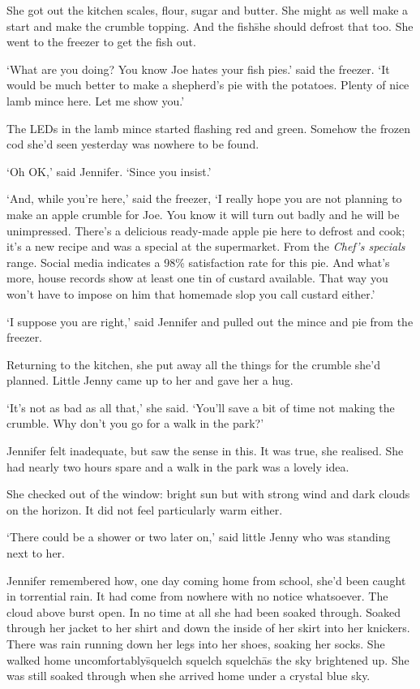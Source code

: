 She got out the kitchen scales, flour, sugar and butter. She might 
as well make a start and make the crumble topping. And the 
fish\=she should defrost that too. She went to the freezer to get 
the fish out.

`What are you doing? You know Joe hates your fish pies.' said the 
freezer. `It would be much better to make a shepherd's pie with 
the potatoes. Plenty of nice lamb mince here. Let me show you.'

The LEDs in the lamb mince started flashing red and green. Somehow 
the frozen cod she'd seen yesterday was nowhere to be found.

`Oh OK,' said Jennifer. `Since you insist.'

`And, while you're here,' said the freezer, `I really hope you are 
not planning to make an apple crumble for Joe. You know it will 
turn out badly and he will be unimpressed. There's a delicious 
ready-made apple pie here to defrost and cook; it's a new 
recipe and was a special at the supermarket. From the 
\textit{Chef's specials} range. Social media indicates a 98\% 
satisfaction rate for this pie. And what's more, house records 
show at least one tin of custard available. That way you won't 
have to impose on him that homemade slop you call custard either.'

`I suppose you are right,' said Jennifer and pulled out the mince 
and pie from the freezer.

Returning to the kitchen, she put away all the things for the 
crumble she'd planned. Little Jenny came up to her and gave her a 
hug.

`It's not as bad as all that,' she said. `You'll save a bit of 
time not making the crumble. Why don't you go for a walk in the 
park?'

Jennifer felt inadequate, but saw the sense in this. It was true, 
she realised. She had nearly two hours spare and a walk in the park 
was a lovely idea.

She checked out of the window: bright sun but with strong wind and dark clouds
on the horizon.  It did not feel particularly warm either.

`There could be a shower or two later on,' said little Jenny who was 
standing next to her.

Jennifer remembered how, one day coming home from school, she'd 
been caught in torrential rain. It had come from nowhere with no 
notice whatsoever. The cloud above burst open. In no time at all 
she had been soaked through. Soaked through her jacket to her 
shirt and down the inside of her skirt into her knickers. There 
was rain running down her legs into her shoes, soaking her socks. 
She walked home uncomfortably\=squelch squelch squelch\=as the sky 
brightened up. She was still soaked through when she arrived home
under a crystal blue sky.

